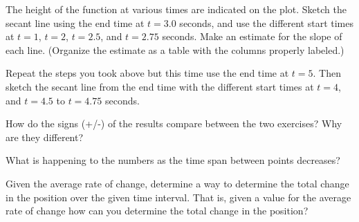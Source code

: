 \begin{problem}
    \begin{subproblem}
    \item The height of the function at various times are indicated on
      the plot. Sketch the secant line using the end time at $t=3.0$
      seconds, and use the different start times at $t=1$, $t=2$,
      $t=2.5$, and $t=2.75$ seconds. Make an estimate for the slope of
      each line. (Organize the estimate as a table with the columns
      properly labeled.)

      \vfill
      \clearpage

    \item Repeat the steps you took above but this time use the end
      time at $t=5$. Then sketch the secant line from the end time
      with the different start times at $t=4$, and $t=4.5$ to $t=4.75$
      seconds.

      \scalebox{0.5}{}

      \vfill

      \clearpage

    \item How do the signs (+/-) of the results compare between the
      two exercises? Why are they different?

      \vfill

    \item What is happening to the numbers as the time span between
      points decreases?

      \vfill

    \item Given the average rate of change, determine a way to
      determine the total change in the position over the given time
      interval. That is, given a value for the average rate of change
      how can you determine the total change in the position?

      \vfill

    \end{subproblem}

\end{problem}


\postClass

